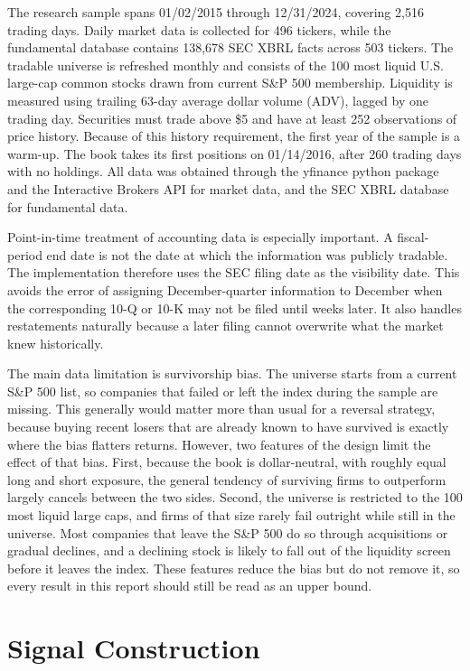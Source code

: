 \documentclass[11pt]{article}
\begin{document}
The research sample spans 01/02/2015 through 12/31/2024, covering 2,516 trading days. Daily market data is collected for 496 tickers, while the fundamental database contains 138,678 SEC XBRL facts across 503 tickers. The tradable universe is refreshed monthly and consists of the 100 most liquid U.S. large-cap common stocks drawn from current S\&P 500 membership. Liquidity is measured using trailing 63-day average dollar volume (ADV), lagged by one trading day. Securities must trade above \$5 and have at least 252 observations of price history. Because of this history requirement, the first year of the sample is a warm-up. The book takes its first positions on 01/14/2016, after 260 trading days with no holdings. All data was obtained through the yfinance python package and the Interactive Brokers API for market data, and the SEC XBRL database for fundamental data.

Point-in-time treatment of accounting data is especially important. A fiscal-period end date is not the date at which the information was publicly tradable. The implementation therefore uses the SEC filing date as the visibility date. This avoids the error of assigning December-quarter information to December when the corresponding 10-Q or 10-K may not be filed until weeks later. It also handles restatements naturally because a later filing cannot overwrite what the market knew historically.

The main data limitation is survivorship bias. The universe starts from a current S\&P 500 list, so companies that failed or left the index during the sample are missing. This generally would matter more than usual for a reversal strategy, because buying recent losers that are already known to have survived is exactly where the bias flatters returns. However, two features of the design limit the effect of that bias. First, because the book is dollar-neutral, with roughly equal long and short exposure, the general tendency of surviving firms to outperform largely cancels between the two sides. Second, the universe is restricted to the 100 most liquid large caps, and firms of that size rarely fail outright while still in the universe. Most companies that leave the S\&P 500 do so through acquisitions or gradual declines, and a declining stock is likely to fall out of the liquidity screen before it leaves the index. These features reduce the bias but do not remove it, so every result in this report should still be read as an upper bound.

\section{Signal Construction}
\label{sec:signals}
\end{document}
